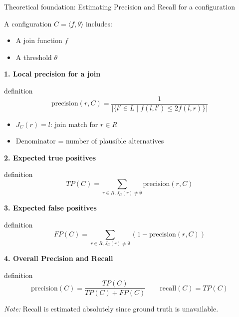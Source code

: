 \documentclass[8pt]{beamer} %
\begin{document}
\begin{frame}{Theoretical foundation: Estimating Precision and Recall for a configuration}
	
	\tiny	
	
	A configuration $C = \langle f, \theta \rangle$ includes:
	\begin{itemize}
		\item A join function $f$
		\item A threshold $\theta$
	\end{itemize}
	
	\textbf{1. Local precision for a join}
	
	\begin{beamercolorbox}[rounded=true, shadow=true, leftskip=1em, rightskip=1em]{definition}		
		$$
		\text{precision}(r, C) =
		\frac{1}{
			|\{ l' \in L \mid f(l, l') \leq 2f(l, r) \}|
		}
		$$
	\end{beamercolorbox}
	\begin{itemize}
		\item $J_C(r) = l$: join match for $r \in R$
		\item Denominator = number of plausible alternatives
	\end{itemize}
	
	\textbf{2. Expected true positives}
	\begin{beamercolorbox}[rounded=true, shadow=true, leftskip=1em, rightskip=1em]{definition}		
	$$
	TP(C) = \sum_{r \in R, J_C(r) \neq \emptyset} \text{precision}(r, C)
	$$
	\end{beamercolorbox}
	
	\textbf{3. Expected false positives}
	\begin{beamercolorbox}[rounded=true, shadow=true, leftskip=1em, rightskip=1em]{definition}		
	$$
	FP(C) = \sum_{r \in R, J_C(r) \neq \emptyset} \left(1 - \text{precision}(r, C)\right)
	$$
	\end{beamercolorbox}
	
	\textbf{4. Overall Precision and Recall}
	\begin{beamercolorbox}[rounded=true, shadow=true, leftskip=1em, rightskip=1em]{definition}		
	$$
	\text{precision}(C) = \frac{TP(C)}{TP(C) + FP(C)} \quad\quad
	\text{recall}(C) = TP(C)
	$$
	\end{beamercolorbox}
	
	\textit{Note:} Recall is estimated absolutely since ground truth is unavailable.
\end{frame}
\end{document}
